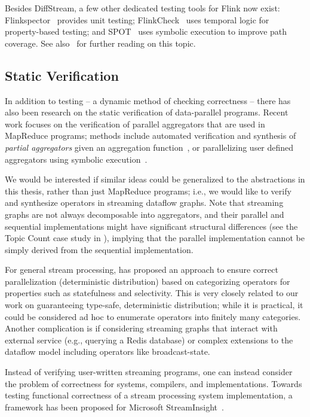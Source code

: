 Besides DiffStream, a few other dedicated testing tools for Flink now exist:
Flinkspector~\cite{flinkspector} provides unit testing;
FlinkCheck~\cite{espinosa2019flinkcheck} uses temporal logic for property-based testing; and SPOT~\cite{ye2021spot} uses symbolic execution to improve path coverage.
See also~\cite{joachim2018methodology} for further reading on this topic.

\subsection{Static Verification}

In addition to testing -- a dynamic method of checking
correctness -- there has also been research on the static verification
of data-parallel programs. Recent work focuses on the verification of
parallel aggregators that are used in MapReduce programs; methods include automated verification and synthesis of \emph{partial
aggregators} given an aggregation function~\cite{liu2014automating},
or parallelizing user defined aggregators using symbolic
execution~\cite{raychev2015parallelizing}.

We would be interested if similar ideas could be generalized to the abstractions in this thesis,
rather than just MapReduce programs;
i.e., we would like to verify and synthesize operators in streaming dataflow graphs.
Note that streaming graphs are not always decomposable into aggregators, and their parallel
and sequential implementations might have significant structural
differences (see the Topic Count case study in
), implying that the parallel implementation cannot be simply
derived from the sequential implementation.

For general stream processing, \cite{schneider2013safe} has proposed an approach to ensure correct parallelization (deterministic distribution) based on categorizing operators for properties such as statefulness and selectivity.
This is very closely related to our work on guaranteeing type-safe, deterministic distribution;
while it is practical, it could be considered ad hoc to enumerate operators into finitely many categories.
Another complication is if considering streaming graphs that interact with external service (e.g., querying a Redis database) or complex extensions to the dataflow model including operators like broadcast-state.

Instead of verifying user-written streaming programs, one can instead consider the problem of correctness for systems, compilers, and implementations.
Towards testing functional correctness of a stream processing system implementation, a framework has been proposed for Microsoft StreamInsight~\cite{raizman2010extensible}.

